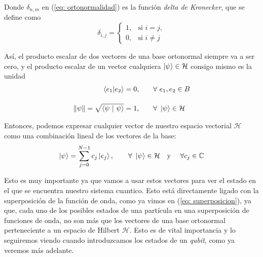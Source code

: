 \documentclass[12pt]{article}
\numberwithin{equation}{section} %
\begin{document}
    \vspace{1.5mm}

    Donde \( \delta_{n, m} \) en (\ref{eq: ortonormalidad}) es la función \textit{delta de Kronecker}, que se define como
    \begin{equation}
        \delta_{i, j} = 
        \begin{cases}
            1, & \text{si } i = j, \\
            0, & \text{si } i \neq j
        \end{cases}
        \label{eq: delta_kronecker}
    \end{equation}

    \vspace{1.5mm}

    Así, el producto escalar de dos vectores de una base ortonormal siempre va a ser cero, y el producto escalar de un vector cualquiera \( \ket{\psi} \in \mathcal{H} \) consigo mismo es la unidad
    \begin{align}
        \braket{e_{1} | e_{2}} = 0, &\qquad \forall \ e_{1}, e_{2} \in B \\[10pt]
        \| \psi \| = \sqrt{\braket{\psi \ | \ \psi}} = 1, &\qquad \forall \ \ket{\psi} \in \mathcal{H}
    \end{align}

    \vspace{1.5mm}

    Entonces, podemos expresar cualquier vector de nuestro espacio vectorial \( \mathcal{H} \) como una combinación lineal de los vectores de la base:
    \begin{equation}
        \ket{\psi} = \sum_{j = 0}^{N - 1} c_{j} \ket{e_{j}}, \qquad \forall \ \ket{\psi} \in \mathcal{H} \quad \text{y} \quad \ \forall c_{j} \in \mathbb{C}
        \label{eq: combinacion_lineal_Hilbert}
    \end{equation}

    \vspace{1.5mm}

    Esto es muy importante ya que vamos a usar estos vectores para ver el estado en el que se encuentra nuestro sistema cuantico. Esto está directamente ligado con la superposición de la función de onda, como ya vimos en (\ref{eq: superposicion}), ya que, cada uno de los posibles estados de una partícula en una superposición de funciones de onda, no son más que los vectores de una base ortonormal perteneciente a un espacio de Hilbert \( \mathcal{H} \). Esto es de vital importancia y lo seguiremos viendo cuando introduzcamos los estados de un \textit{qubit}, como ya veremos más adelante.
\end{document}
